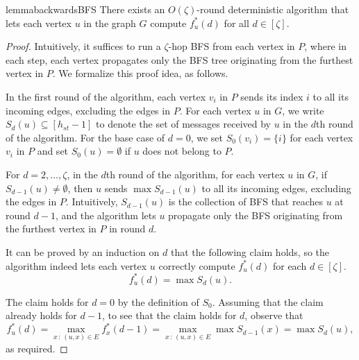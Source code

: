 \begin{restatable}{lemma}{backwardsBFS}
\label{Thm: Backward BFS Works}
There exists an $O(\zeta)$-round deterministic algorithm that lets each vertex $u$ in the graph $G$ compute $f_u^\ast(d)$ for all $d \in [\zeta]$.
\end{restatable}
\begin{proof}
Intuitively, it suffices to run a $\zeta$-hop  BFS from each vertex in $P$, where in each step, each vertex propagates only the BFS tree originating from the furthest vertex in $P$. We formalize this proof idea, as follows.


In the first round of the algorithm, each vertex $v_i$ in $P$ sends its index $i$ to all its incoming edges, excluding the edges in $P$. 
For each vertex $u$ in $G$, we write $S_d(u) \subseteq[h_{st}-1]$ to denote the set of messages received by $u$ in the $d$th round of the algorithm. For the base case of $d = 0$, we set $S_0(v_i) = \{i\}$ for each vertex $v_i$ in $P$ and set $S_0(u) = \emptyset$ if $u$ does not belong to $P$.

For $d = 2, \ldots, \zeta$, in the $d$th round of the algorithm, for each vertex $u$ in $G$, if $S_{d-1}(u) \neq \emptyset$, then $u$ sends $\max S_{d-1}(u)$ to all its incoming edges, excluding the edges in $P$. Intuitively, $S_{d-1}(u)$ is the collection of BFS that reaches $u$ at round $d-1$, and the algorithm lets $u$ propagate only the BFS originating from the furthest vertex in $P$ in round $d$. 

It can be proved by an induction on $d$ that the following claim holds, so the algorithm indeed lets each vertex $u$ correctly compute $f_u^\ast(d)$ for each $d \in [\zeta]$.
\[f_u^\ast(d) = \max S_{d}(u).\]

The claim holds for $d=0$ by the definition of $S_0$. Assuming that the claim already holds for $d-1$, to see that the claim holds for $d$, observe that
\[f_u^\ast(d) = \max_{x \, : \, (u,x)\in E} f_{x}^\ast(d-1) = \max_{x \, : \, (u,x)\in E}\max S_{d-1}(x) = \max S_{d}(u),\]
as required.
\end{proof}

